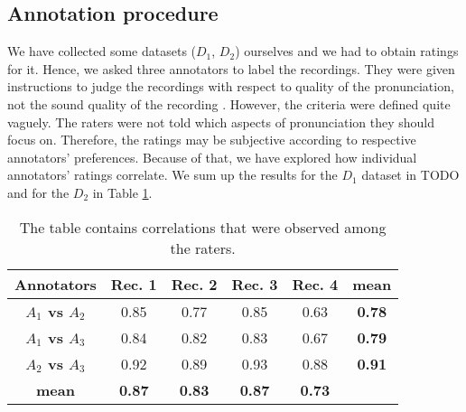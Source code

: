\subsection{Annotation procedure}
We have collected some datasets ($D_1$, $D_2$) ourselves and we had to obtain ratings for it.
Hence, we asked three annotators to label the recordings.
They were given instructions to judge the recordings with respect to quality of the pronunciation, not the sound quality of the recording .
However, the criteria were defined quite vaguely.
The raters were not told which aspects of pronunciation they should focus on.
Therefore, the ratings may be subjective according to respective annotators' preferences.
Because of that, we have explored how individual annotators' ratings correlate.
We sum up the results for the $D_1$ dataset in TODO and for the $D_2$ in Table \ref{annotatorstbl}.
\begin{table}
\begin{center}
\begin{tabular}{ |c|c|c|c|c|c| } 
 \hline
 \textbf{Annotators} & \textbf{Rec. 1} & \textbf{Rec. 2} & \textbf{Rec. 3} & \textbf{Rec. 4} & \textbf{mean} \\ \hline
\textbf{$A_1$ vs $A_2$} & 0.85 & 0.77 & 0.85 & 0.63 & \textbf{0.78} \\ \hline
\textbf{$A_1$ vs $A_3$} & 0.84 & 0.82 & 0.83 & 0.67 & \textbf{0.79} \\ \hline 
\textbf{$A_2$ vs $A_3$} & 0.92 & 0.89 & 0.93 & 0.88 & \textbf{0.91} \\ \hline 
\textbf{mean} & \textbf{0.87} & \textbf{0.83} & \textbf{0.87} & \textbf{0.73} &  \\ \hline 
 \end{tabular}
\end{center}
\label{annotatorstbl}
\caption{The table contains correlations that were observed among the raters.}
\end{table}
